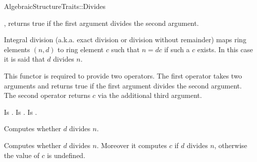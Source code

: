\begin{ccRefFunctionObjectConcept}{AlgebraicStructureTraits::Divides}

\ccDefinition

, 
returns true if the first argument divides the second argument. 

Integral division (a.k.a. exact division or division without remainder) maps 
ring elements $(n,d)$ to ring element $c$ such that $n = dc$ if such a $c$ 
exists. In this case it is said that $d$ divides $n$. 

This functor is required to provide two operators. The first operator takes two
arguments and returns true if the first argument divides the second argument. 
The second operator returns $c$ via the additional third argument. 

\ccRefines 


\ccTypes
{} 
        { Is .}
\ccGlue
{} 
        { Is .}
\ccGlue
{} 
        { Is .}

\ccOperations
{}

        { Computes whether $d$ divides $n$. }

        { 
        Computes whether $d$ divides $n$.
        Moreover it computes $c$ if $d$ divides $n$, 
        otherwise the value of $c$ is undefined. 
        }


\ccSeeAlso

\\

\end{ccRefFunctionObjectConcept} 
